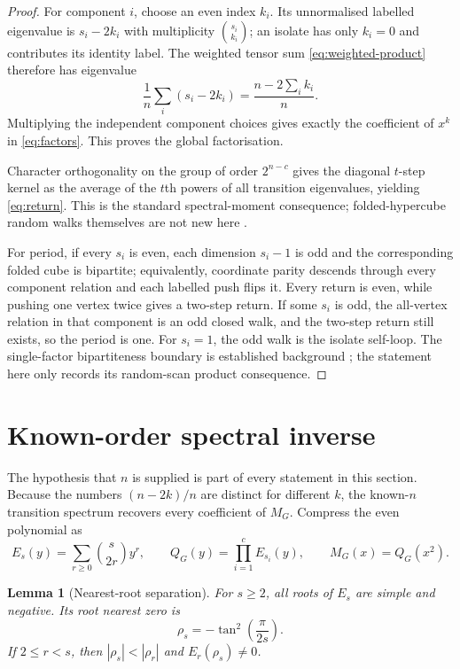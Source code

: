 \documentclass[10pt,a4paper]{amsart}
\newtheorem{lemma}[theorem]{Lemma}
\theoremstyle{remark}
\begin{document}
\begin{proof}
For component $i$, choose an even index $k_i$.  Its unnormalised labelled
eigenvalue is $s_i-2k_i$ with multiplicity $\binom{s_i}{k_i}$; an isolate has
only $k_i=0$ and contributes its identity label.  The weighted tensor sum
\eqref{eq:weighted-product} therefore has eigenvalue
\[
 \frac1n\sum_i(s_i-2k_i)
     =\frac{n-2\sum_i k_i}{n}.
\]
Multiplying the independent component choices gives exactly the coefficient
of $x^k$ in \eqref{eq:factors}.  This proves the global factorisation.

Character orthogonality on the group of order $2^{n-c}$ gives the diagonal
$t$-step kernel as the average of the $t$th powers of all transition
eigenvalues, yielding \eqref{eq:return}.  This is the standard spectral-moment
consequence; folded-hypercube random walks themselves are not new here
\citep{ChenLiLin2019RandomWalks}.

For period, if every $s_i$ is even, each dimension $s_i-1$ is odd and the
corresponding folded cube is bipartite; equivalently, coordinate parity
descends through every component relation and each labelled push flips it.
Every return is even, while pushing one vertex twice gives a two-step return.
If some $s_i$ is odd, the all-vertex relation in that component is an odd
closed walk, and the two-step return still exists, so the period is one.  For
$s_i=1$, the odd walk is the isolate self-loop.  The single-factor
bipartiteness boundary is established background
\citep{XuMa2006Cycles}; the statement here only records its random-scan product
consequence.
\end{proof}

\section{Known-order spectral inverse}\label{sec:inverse}

The hypothesis that $n$ is supplied is part of every statement in this
section.  Because the numbers $(n-2k)/n$ are distinct for different $k$, the
known-$n$ transition spectrum recovers every coefficient of $M_G$.  Compress
the even polynomial as
\begin{equation}\label{eq:compressed}
 E_s(y)=\sum_{r\geq0}\binom{s}{2r}y^r,
 \qquad
 Q_G(y)=\prod_{i=1}^cE_{s_i}(y),
 \qquad M_G(x)=Q_G(x^2).
\end{equation}

\begin{lemma}[Nearest-root separation]\label{lem:roots}
For $s\geq2$, all roots of $E_s$ are simple and negative.  Its root nearest
zero is
\begin{equation}\label{eq:rho}
                 \rho_s=-\tan^2\!\left(\frac{\pi}{2s}\right).
\end{equation}
If $2\leq r<s$, then $|\rho_s|<|\rho_r|$ and
$E_r(\rho_s)\ne0$.
\end{lemma}
\end{document}
